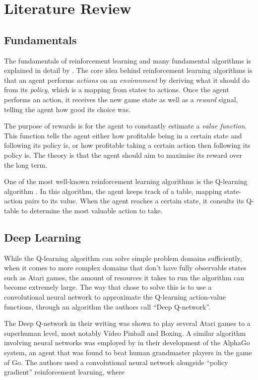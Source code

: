\documentclass[11pt,a4paper]{article}
\begin{document}
\section{Literature Review}
\subsection{Fundamentals}
The fundamentals of reinforcement learning and many fundamental algorithms is explained in detail by \cite{sutton18}. The core idea behind reinforcement learning algorithms is that an agent performs \emph{actions} on an \emph{environment} by deriving what it should do from its \emph{policy}, which is a mapping from states to actions. Once the agent performs an action, it receives the new game state as well as a \emph{reward} signal, telling the agent how good its choice was.

The purpose of rewards is for the agent to constantly estimate a \emph{value function}. This function tells the agent either how profitable being in a certain state and following its policy is, or how profitable taking a certain action then following its policy is. The theory is that the agent should aim to maximise its reward over the long term.

One of the most well-known reinforcement learning algorithms is the Q-learning algorithm \cite[Chapter~6.5]{sutton18}. In this algorithm, the agent keeps track of a table, mapping state-action pairs to its value. When the agent reaches a certain state, it consults its Q-table to determine the most valuable action to take.

\subsection{Deep Learning}
While the Q-learning algorithm can solve simple problem domains sufficiently, when it comes to more complex domains that don't have fully observable states such as Atari games, the amount of resources it takes to run the algorithm can become extremely large. The way that \cite{mnih15} chose to solve this is to use a convolutional neural network to approximate the Q-learning action-value functions, through an algorithm the authors call ``Deep Q-network''.

The Deep Q-network in their writing was shown to play several Atari games to a superhuman level, most notably Video Pinball and Boxing. A similar algorithm involving neural networks was employed by \cite{silver16} in their development of the AlphaGo system, an agent that was found to beat human grandmaster players in the game of Go. The authors used a convolutional neural network alongside ``policy gradient'' reinforcement learning, where
\end{document}
